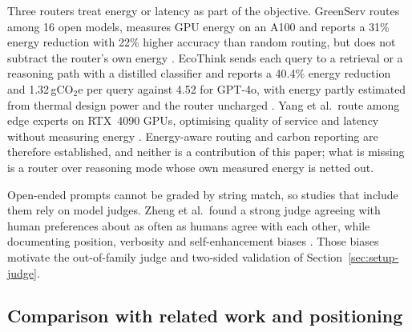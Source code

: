 Three routers treat energy or latency as part of the objective. GreenServ
routes among 16 open models, measures GPU energy on an A100 and reports a
31\% energy reduction with 22\% higher accuracy than random routing, but does
not subtract the router's own energy \cite{ziller2026greenserv}. EcoThink
sends each query to a retrieval or a reasoning path with a distilled
classifier and reports a 40.4\% energy reduction and 1.32\,gCO$_2$e per query
against 4.52 for GPT-4o, with energy partly estimated from thermal design
power and the router uncharged \cite{li2026ecothink}. Yang et al.\ route
among edge experts on RTX~4090 GPUs, optimising quality of service and
latency without measuring energy \cite{yang2025qosrouting}. Energy-aware
routing and carbon reporting are therefore established, and neither is a
contribution of this paper; what is missing is a router over reasoning mode
whose own measured energy is netted out.

Open-ended prompts cannot be graded by string match, so studies that include
them rely on model judges. Zheng et al.\ found a strong judge agreeing with
human preferences about as often as humans agree with each other, while
documenting position, verbosity and self-enhancement biases
\cite{zheng2023judging}. Those biases motivate the out-of-family judge and
two-sided validation of Section~\ref{sec:setup-judge}.

\subsection{Comparison with related work and positioning}
\label{sec:related-gap}

